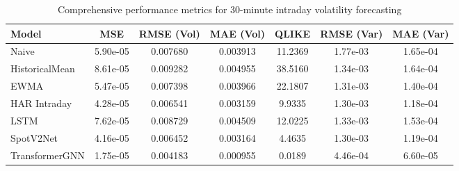 \documentclass[journal]{IEEEtran}
\begin{document}
\begin{table*}[!t]
\centering
\caption{Comprehensive performance metrics for 30-minute intraday volatility forecasting}
\label{tab:comprehensive_results}
\begin{tabular}{@{}lS[table-format=1.2e-1]S[table-format=1.6]S[table-format=1.6]S[table-format=1.4]S[table-format=1.2e-1]S[table-format=1.2e-1]@{}}
\toprule
{Model} & {MSE} & {RMSE (Vol)} & {MAE (Vol)} & {QLIKE} & {RMSE (Var)} & {MAE (Var)} \\
\midrule
{}Naive & 5.90e-05 & 0.007680 & 0.003913 & 11.2369 & 1.77e-03 & 1.65e-04 \\
HistoricalMean & 8.61e-05 & 0.009282 & 0.004955 & 38.5160 & 1.34e-03 & 1.64e-04 \\
EWMA & 5.47e-05 & 0.007398 & 0.003966 & 22.1807 & 1.31e-03 & 1.40e-04 \\
HAR Intraday & 4.28e-05 & 0.006541 & 0.003159 & 9.9335 & 1.30e-03 & 1.18e-04 \\
LSTM & 7.62e-05 & 0.008729 & 0.004509 & 12.0225 & 1.33e-03 & 1.53e-04 \\
SpotV2Net & 4.16e-05 & 0.006452 & 0.003164 & 4.4635 & 1.30e-03 & 1.19e-04 \\
TransformerGNN & 1.75e-05 & 0.004183 & 0.000955 & 0.0189 & 4.46e-04 & 6.60e-05 \\
\bottomrule
\end{tabular}
\end{table*}
\end{document}
